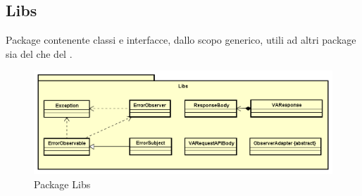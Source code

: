 \newpage
\subsection{Libs}
Package contenente classi e interfacce, dallo scopo generico, utili ad altri package sia del  che del .
\begin{figure}[h] \centering \includegraphics[width=\textwidth,height=\textheight,keepaspectratio]{images/diagrams/back-end/Official_Backend_0304/Libs.png}
	\caption{Package Libs}
\end{figure}
\newpage

